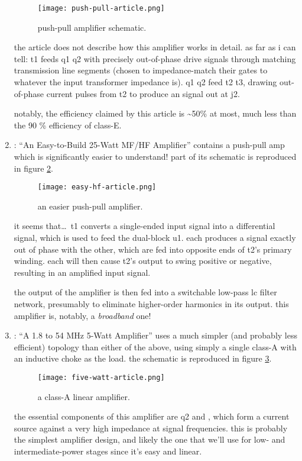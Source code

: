\begin{enumerate}
	\begin{figure}[H]
		\centering
		\texttt{[image: push-pull-article.png]}
		\caption{push-pull amplifier schematic.}
		\label{fig:push-pull-article}
	\end{figure}

	the article does not describe how this amplifier works in detail. as
	far as i can tell: \pr t1 feeds \pr q1 \amp \pr q2 with precisely
	out-of-phase drive signals through matching transmission line segments
	 (chosen to impedance-match their gates to whatever
	the input transformer impedance is). \pr q1 \amp \pr q2 feed \pr t2
	\amp \pr t3, drawing out-of-phase current pulses from \pr t2 to produce
	an \rf signal out at \pr j2.

	notably, the efficiency claimed by this article is \textasciitilde 50\%
	at most, much less than the 90 \% efficiency of class-E.

	\item \autocite[p.~1 dash 2]{rf-amp-classics}: ``An Easy-to-Build
	25-Watt MF/HF Amplifier'' contains a push-pull amp which is
	significantly easier to understand! part of its schematic is reproduced
	in figure \ref{fig:easy-hf-article}.

	\begin{figure}[H]
		\centering
		\texttt{[image: easy-hf-article.png]}
		\caption{an easier push-pull amplifier.}
		\label{fig:easy-hf-article}
	\end{figure}

	it seems that\ldots\ \pr t1 converts a single-ended input signal into a
	differential signal, which is used to feed the dual-\jfet block \pr u1.
	each \jfet produces a signal exactly out of phase with the other, which
	are fed into opposite ends of \pr t2's primary winding. each \jfet will
	then cause \pr t2's output to swing positive or negative, resulting in
	an amplified input signal.

	the output of the amplifier is then fed into a switchable low-pass lc
	filter network, presumably to eliminate higher-order harmonics in its
	output. this amplifier is, notably, a \emph{broadband} one!

	\item \autocite[p.~1 dash 19]{rf-amp-classics}: ``A 1.8 to 54 MHz
	5-Watt Amplifier'' uses a much simpler (and probably less efficient)
	topology than either of the above, using simply a single \mosfet
	class-A with an inductive choke as the load. the schematic is
	reproduced in figure \ref{fig:five-watt-article}.

	\begin{figure}[H]
		\centering
		\texttt{[image: five-watt-article.png]}
		\caption{a class-A linear amplifier.}
		\label{fig:five-watt-article}
	\end{figure}

	the essential components of this amplifier are \pr q2 and ,
	which form a current source against a very high impedance at signal
	frequencies. this is probably the simplest \rf amplifier design, and
	likely the one that we'll use for low- and intermediate-power stages
	since it's easy and linear.
\end{enumerate}


